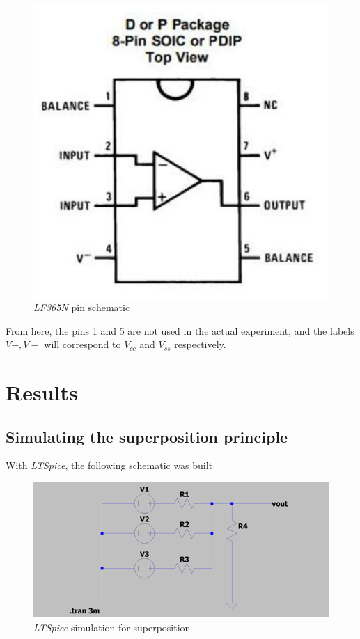 \documentclass[english,12pt]{article}
\newcommand{\ltspice}[]{\textit{LTSpice} }
\begin{document}
\begin{figure}[h]
    \centering
    \includegraphics[scale=0.33]{pinout.png}
    \caption{\textit{LF365N} pin schematic}
    \label{fig:91}
\end{figure}

From here, the pins 1 and 5 are not used in the actual experiment, and the labels $V+,V-$ will correspond to $V_{cc}$ and $V_{ss}$ respectively.

\section{Results}

\subsection{Simulating the superposition principle}

With \textit{LTSpice}, the following schematic was built

\begin{figure}[h]
    \centering
    \includegraphics[scale=0.8]{exp1-circuit.png}
    \caption{\ltspice simulation for superposition}
    \label{fig:9}
\end{figure}
\end{document}
